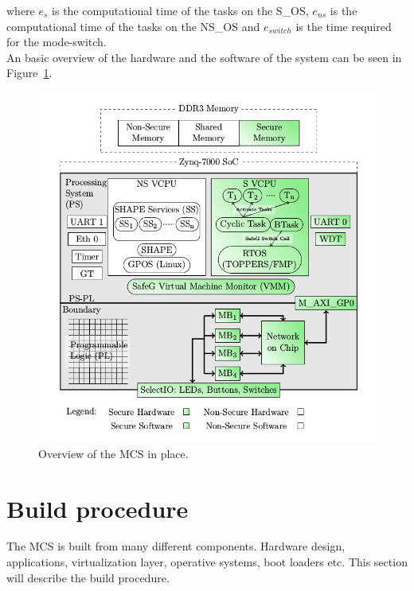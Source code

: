 where $e_s$ is the computational time of the tasks on the S\_OS, $e_{ns}$ is the computational time of the tasks on the NS\_OS and $e_{switch}$ is the time required for the mode-switch.\\

An basic overview of the hardware and the software of the system can be seen in Figure~\ref{fig:system_overview}.

\begin{figure}[H]
\centering
\includegraphics[width=\textwidth]{./img/literature_overview.png}
\caption{Overview of the MCS in place.\cite{zaki2016}}\label{fig:system_overview}
\end{figure}

\section{Build procedure}
The MCS is built from many different components. Hardware design,  applications, virtualization layer, operative systems, boot loaders etc. This section will describe the build procedure.\\ %


